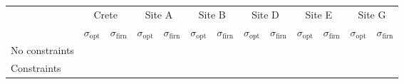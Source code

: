 \documentclass[../../CompleteThesis/Complete_1stDraft]{subfiles}
\begin{document}
\begin{table}[ht]
	\centering
	\begin{tabular}{l||*{6}{c | c||}}
		&
		\multicolumn{2}{c}{Crete} & \multicolumn{2}{c}{Site A} & \multicolumn{2}{c}{Site B} & \multicolumn{2}{c}{Site D} & \multicolumn{2}{c}{Site E} & \multicolumn{2}{c||}{Site G} \\
		&
		$\sigma_{\text{opt}}$ & $\sigma_{\text{firn}}$ & $\sigma_{\text{opt}}$ & $\sigma_{\text{firn}}$ & $\sigma_{\text{opt}}$ & $\sigma_{\text{firn}}$ & $\sigma_{\text{opt}}$ & $\sigma_{\text{firn}}$ & $\sigma_{\text{opt}}$ & $\sigma_{\text{firn}}$ & $\sigma_{\text{opt}}$ & $\sigma_{\text{firn}}$ \\
		
		\hline
 		No constraints & & & & & & & & & & & & \\ 
		Constraints & & & & & & & & & & & & \\ 
	\end{tabular}
\end{table}
\end{document}
